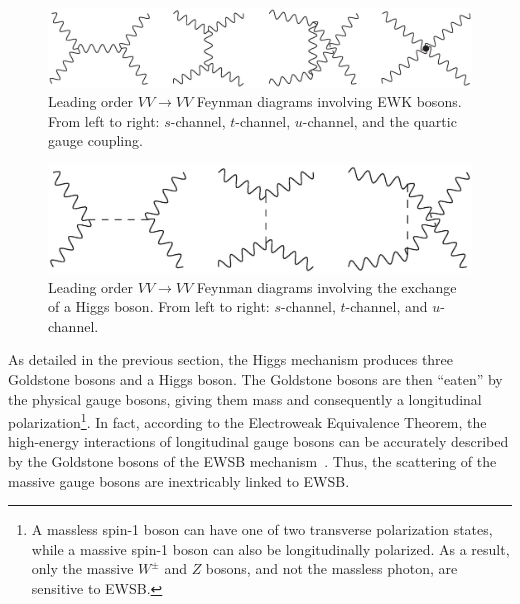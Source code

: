 \begin{figure}[htbp]
  \centering
  \includegraphics[height=.125\textheight]{figs/theory/vbs_ewk}
  \caption{Leading order $VV\rightarrow VV$ Feynman diagrams involving EWK bosons. From left to right: $s$-channel, $t$-channel, $u$-channel, and the quartic gauge coupling.}
  \label{fig:theory_vbs_ewk}
\end{figure}
\begin{figure}[htbp]
  \centering
  \includegraphics[height=.125\textheight]{figs/theory/vbs_higgs}
  \caption{Leading order $VV\rightarrow VV$ Feynman diagrams involving the exchange of a Higgs boson. From left to right: $s$-channel, $t$-channel, and $u$-channel.}
  \label{fig:theory_vbs_higgs}
\end{figure}

As detailed in the previous section, the Higgs mechanism produces three Goldstone bosons and a Higgs boson.
The Goldstone bosons are then ``eaten'' by the physical gauge bosons, giving them mass and consequently a longitudinal polarization\footnote{A massless spin-1 boson can have one of two transverse polarization states, while a massive spin-1 boson can also be longitudinally polarized.  As a result, only the massive $W^{\pm}$ and $Z$ bosons, and not the massless photon, are sensitive to EWSB.}.
In fact, according to the Electroweak Equivalence Theorem, the high-energy interactions of longitudinal gauge bosons can be accurately described by the Goldstone bosons of the EWSB mechanism~\cite{1997.ewk-equivalence}.
Thus, the scattering of the massive gauge bosons are inextricably linked to EWSB.

